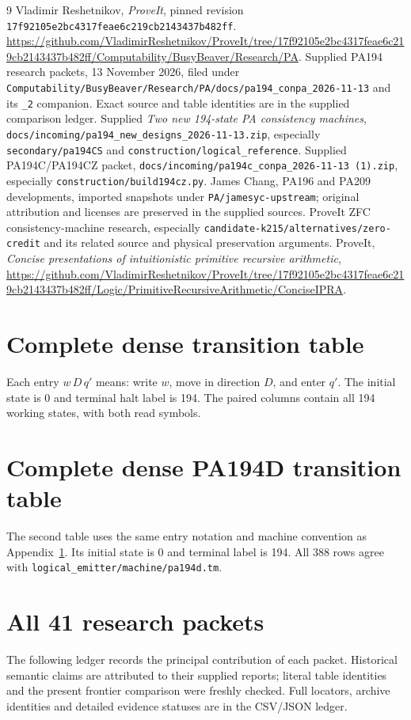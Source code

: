 \documentclass[11pt,letterpaper]{article}
\newcommand{\file}[1]{\texttt{\nolinkurl{#1}}}
\begin{document}
\begin{thebibliography}{9}
 Vladimir Reshetnikov, \emph{ProveIt}, pinned revision
\nolinkurl{17f92105e2bc4317feae6c219cb2143437b482ff}.
\url{https://github.com/VladimirReshetnikov/ProveIt/tree/17f92105e2bc4317feae6c219cb2143437b482ff/Computability/BusyBeaver/Research/PA}.
 Supplied PA194 research packets, 13 November 2026,
filed under \file{Computability/BusyBeaver/Research/PA/docs/pa194_conpa_2026-11-13}
and its \file{_2} companion. Exact source and table identities are in
the supplied comparison ledger.
 Supplied \emph{Two new 194-state PA consistency machines},
\file{docs/incoming/pa194_new_designs_2026-11-13.zip}, especially
\file{secondary/pa194CS} and \file{construction/logical_reference}.
 Supplied PA194C/PA194CZ packet,
\file{docs/incoming/pa194c_conpa_2026-11-13 (1).zip}, especially
\file{construction/build194cz.py}.
 James Chang, PA196 and PA209 developments, imported
snapshots under \file{PA/jamesyc-upstream}; original attribution and
licenses are preserved in the supplied sources.
 ProveIt ZFC consistency-machine research, especially
\file{candidate-k215/alternatives/zero-credit} and its related source
and physical preservation arguments.
 ProveIt, \emph{Concise presentations of intuitionistic
primitive recursive arithmetic},
\url{https://github.com/VladimirReshetnikov/ProveIt/tree/17f92105e2bc4317feae6c219cb2143437b482ff/Logic/PrimitiveRecursiveArithmetic/ConciseIPRA}.
\end{thebibliography}

\clearpage\appendix
\section{Complete dense transition table}
\label{app:table}
Each entry \(w\,D\,q'\) means: write \(w\), move in direction \(D\),
and enter \(q'\). The initial state is 0 and terminal halt label is 194.
The paired columns contain all 194 working states, with both read symbols.


\clearpage
\section{Complete dense PA194D transition table}
\label{app:table_d}
The second table uses the same entry notation and machine convention as
Appendix~\ref{app:table}. Its initial state is 0 and terminal label is 194.
All 388 rows agree with \file{logical_emitter/machine/pa194d.tm}.


\clearpage
\section{All 41 research packets}
\label{app:ledger}
The following ledger records the principal contribution of each packet.
Historical semantic claims are attributed to their supplied reports;
literal table identities and the present frontier comparison were freshly
checked. Full locators, archive identities and detailed evidence statuses
are in the CSV/JSON ledger.

\end{document}
